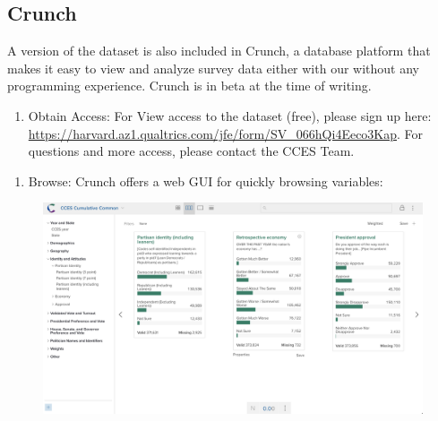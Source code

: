 \documentclass[10pt,article,oneside]{memoir}
\theoremstyle{definition}
\begin{document}
\subsection{Crunch}\label{crunch}

A version of the dataset is also included in Crunch, a database platform
that makes it easy to view and analyze survey data either with our
without any programming experience. Crunch is in beta at the time of
writing.

\begin{enumerate}
\def\labelenumi{\arabic{enumi}.}
\tightlist
\item
  Obtain Access: For View access to the dataset (free), please sign up
  here:
  \url{https://harvard.az1.qualtrics.com/jfe/form/SV_066hQi4Eeco3Kap}.
  For questions and more access, please contact the CCES Team.
\end{enumerate}

\newpage

\begin{enumerate}
\def\labelenumi{\arabic{enumi}.}
\setcounter{enumi}{1}
\tightlist
\item
  Browse: Crunch offers a web GUI for quickly browsing variables:
\end{enumerate}

\begin{figure}[H]
\centering
\centerline{\includegraphics[width=1.05\linewidth]{01_crunch_browse.png}}
\end{figure}
\end{document}
